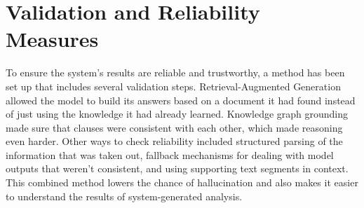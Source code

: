 \section{Validation and Reliability Measures}
To ensure the system's results are reliable and trustworthy, a method
has been set up that includes several validation steps.
Retrieval-Augmented Generation allowed the model to build its answers
based on a document it had found instead of just using the knowledge
it had already learned. Knowledge graph grounding made sure that
clauses were consistent with each other, which made reasoning even
harder. Other ways to check reliability included structured parsing
of the information that was taken out, fallback mechanisms for
dealing with model outputs that weren't consistent, and using
supporting text segments in context. This combined method lowers the
chance of hallucination and also makes it easier to understand the
results of system-generated analysis.
